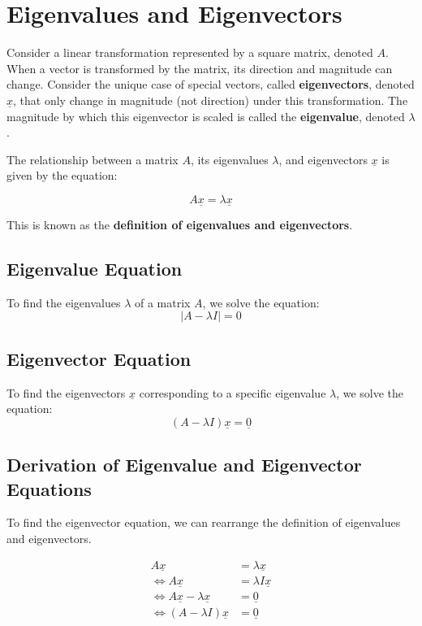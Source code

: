 \chapter{Eigenvalues and Eigenvectors}

Consider a linear transformation represented by a square matrix, denoted $A$. When a vector is transformed by the matrix, its direction and magnitude can change. Consider the unique case of special vectors, called \textbf{eigenvectors}, denoted $\underline{x}$, that only change in magnitude (not direction) under this transformation. The magnitude by which this eigenvector is scaled is called the \textbf{eigenvalue}, denoted $\lambda$.

The relationship between a matrix $A$, its eigenvalues $\lambda$, and eigenvectors $\underline{x}$ is given by the equation:

$$A \underline{x} = \lambda \underline{x}$$

This is known as the \textbf{definition of eigenvalues and eigenvectors}.

\section{Eigenvalue Equation}

To find the eigenvalues $\lambda$ of a matrix $A$, we solve the equation:
$$|A - \lambda I| = 0$$

\section{Eigenvector Equation}

To find the eigenvectors $\underline{x}$ corresponding to a specific eigenvalue $\lambda$, we solve the equation:
$$(A - \lambda I) \underline{x} = \underline{0}$$

\section{Derivation of Eigenvalue and Eigenvector Equations}

To find the eigenvector equation, we can rearrange the definition of eigenvalues and eigenvectors. 

$$
\begin{aligned}
A \underline{x} &= \lambda \underline{x} \\
\iff A \underline{x} &= \lambda I \underline{x} \\
\iff A \underline{x} - \lambda \underline{x} &= \underline{0} \\
\iff (A - \lambda I) \underline{x} &= \underline{0} \\
\end{aligned}
$$

